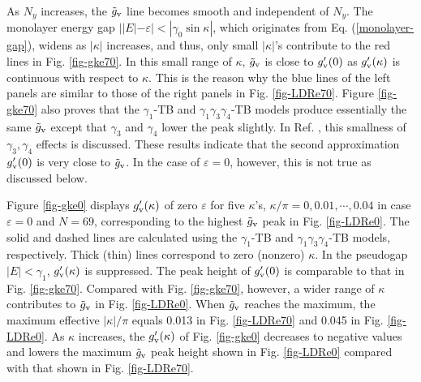 \documentclass{jpsj3}
\begin{document}
As $N_y$ increases, the $\tilde{g}_{\rm v}$ line becomes
smooth and independent of $N_y$.
The monolayer energy gap $||E|-\varepsilon| < |\gamma_0 \sin \kappa|$,
 which originates from Eq. (\ref{monolayer-gap}),
widens as $|\kappa|$ increases,
 and thus, only small $|\kappa|$'s contribute to
the red lines in Fig. \ref{fig-gke70}.
In this small range of $\kappa$, 
$\tilde{g}_{\rm v}$ is close to 
$g'_{\rm v}(0)$ as $g'_{\rm v}(\kappa)$ is continuous
with respect to $\kappa$. 
This is the reason why the blue lines of the left panels
are similar to those of the right panels in Fig. \ref{fig-LDRe70}.
Figure \ref{fig-gke70} also proves that 
the $\gamma_1$-TB and 
$\gamma_1\gamma_3\gamma_4$-TB models
produce essentially the same $\tilde{g}_{\rm v}$
except that $\gamma_3$ and $\gamma_4$ lower the peak slightly.
In Ref. \cite{tamura-2019} , this smallness of $\gamma_3,\gamma_4$ effects
 is discussed.
These results indicate that
the second approximation $g'_{\rm v}(0)$ is very close to
$\tilde{g}_{\rm v}$.
In the case of $\varepsilon=0$, however, this is not true
as discussed below.



Figure \ref{fig-gke0}
displays
$g'_{\rm v}(\kappa)$ of zero $\varepsilon$ 
for five $\kappa$'s, $\kappa/\pi= 0, 0.01 ,\cdots,0.04$
in case $\varepsilon=0$ and $N=69$, 
corresponding
to the highest $\tilde{g}_{\rm v}$ peak in Fig. \ref{fig-LDRe0}.
The solid and dashed lines are calculated using the $\gamma_1$-TB and 
$\gamma_1\gamma_3\gamma_4$-TB models, respectively.
Thick (thin) lines correspond to zero (nonzero) $\kappa$. 
In the pseudogap $|E| < \gamma_1$, 
$g'_{\rm v}(\kappa)$ is suppressed.
The peak height of 
$g'_{\rm v}(0)$ is comparable to that in Fig. \ref{fig-gke70}.
Compared with Fig. \ref{fig-gke70}, however, a wider range of $\kappa$ contributes to $\tilde{g}_{\rm v}$ in Fig. \ref{fig-LDRe0}.
When $\tilde{g}_{\rm v}$ reaches the maximum,
the maximum  effective $|\kappa|/\pi$ equals 0.013
in Fig. \ref{fig-LDRe70} and 0.045 in Fig. \ref{fig-LDRe0}.
As $\kappa$ increases, 
the $g'_{\rm v}(\kappa)$ of Fig. \ref{fig-gke0}
decreases to negative values
and lowers the maximum $\tilde{g}_{\rm v}$ peak height 
shown in Fig. \ref{fig-LDRe0} compared with that shown in  Fig. \ref{fig-LDRe70}.
\end{document}
